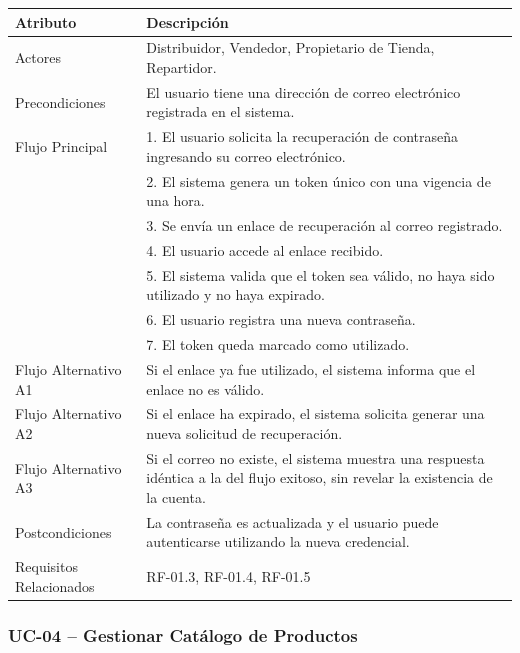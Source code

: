 \documentclass[12pt,a4paper]{report}
\begin{document}
\begin{longtable}{|p{4cm}|p{10cm}|}
\hline
\textbf{Atributo} & \textbf{Descripción} \\ \hline
Actores & Distribuidor, Vendedor, Propietario de Tienda, Repartidor. \\ \hline
Precondiciones & El usuario tiene una dirección de correo electrónico registrada en el sistema. \\ \hline
Flujo Principal &
1. El usuario solicita la recuperación de contraseña ingresando su correo electrónico.\\
& 2. El sistema genera un token único con una vigencia de una hora.\\
& 3. Se envía un enlace de recuperación al correo registrado.\\
& 4. El usuario accede al enlace recibido.\\
& 5. El sistema valida que el token sea válido, no haya sido utilizado y no haya expirado.\\
& 6. El usuario registra una nueva contraseña.\\
& 7. El token queda marcado como utilizado. \\ \hline
Flujo Alternativo A1 & Si el enlace ya fue utilizado, el sistema informa que el enlace no es válido. \\ \hline
Flujo Alternativo A2 & Si el enlace ha expirado, el sistema solicita generar una nueva solicitud de recuperación. \\ \hline
Flujo Alternativo A3 & Si el correo no existe, el sistema muestra una respuesta idéntica a la del flujo exitoso, sin revelar la existencia de la cuenta. \\ \hline
Postcondiciones & La contraseña es actualizada y el usuario puede autenticarse utilizando la nueva credencial. \\ \hline
Requisitos Relacionados & RF-01.3, RF-01.4, RF-01.5 \\ \hline
\end{longtable}
\subsubsection{UC-04 -- Gestionar Catálogo de Productos}
\end{document}
